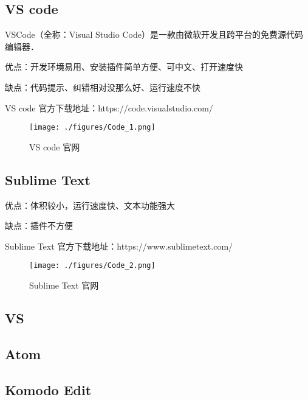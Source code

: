 
\subsection{VS code}

VSCode（全称：Visual Studio Code）是一款由微软开发且跨平台的免费源代码编辑器．

优点：开发环境易用、安装插件简单方便、可中文、打开速度快

缺点：代码提示、纠错相对没那么好、运行速度不快

VS code 官方下载地址：https://code.visualstudio.com/

\begin{figure}[ht]
\centering
\texttt{[image: ./figures/Code\_1.png]}
\caption{VS code 官网} \label{Code_fig1}
\end{figure}

\subsection{Sublime Text}

优点：体积较小，运行速度快、文本功能强大

缺点：插件不方便

Sublime Text 官方下载地址：https://www.sublimetext.com/

\begin{figure}[ht]
\centering
\texttt{[image: ./figures/Code\_2.png]}
\caption{Sublime Text 官网} \label{Code_fig2}
\end{figure}

\subsection{VS}

\subsection{Atom}

\subsection{Komodo Edit}
